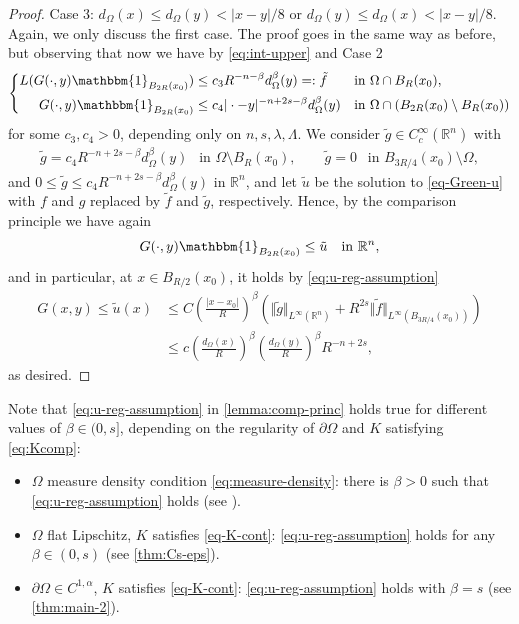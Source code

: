 \documentclass[11pt,reqno]{amsart}
\theoremstyle{plain}
\theoremstyle{definition}
\numberwithin{equation}{section}
\newcommand{\R}{\mathbb{R}}
\newcommand{\1}{\mathbbm{1}}
\begin{document}
\begin{proof}
Case 3: $d_{\Omega}(x) \le d_{\Omega}(y) < |x-y|/8$ or $d_{\Omega}(y) \le d_{\Omega}(x) < |x-y|/8$. Again, we only discuss the first case. The proof goes in the same way as before, but observing that now we have by \eqref{eq:int-upper} and Case 2
\begin{align*}
\left\{
\begin{aligned}
L(G(\cdot,y)\mathbbm{1}_{B_{2R}(x_0)}) &\le c_3 R^{-n-\beta} d_{\Omega}^{\beta}(y) =:\tilde{f} &&\text{in } \Omega \cap B_{R}(x_0), \\
G(\cdot,y)\mathbbm{1}_{B_{2R}(x_0)} &\le c_4 |\cdot-y|^{-n+2s-\beta} d_{\Omega}^{\beta}(y) &&\text{in } \Omega \cap (B_{2R}(x_0) \setminus B_{R}(x_0))
\end{aligned}
\right.
\end{align*}
for some $c_3, c_4 > 0$, depending only on $n,s,\lambda,\Lambda$. We consider $\tilde{g} \in C_c^{\infty}(\R^n)$ with
\begin{align*}
        \tilde{g} = c_4 R^{-n+2s-\beta}d_{\Omega}^{\beta}(y) ~~ \text{ in } \Omega \setminus B_R(x_0), \qquad \tilde{g} = 0~~ \text{ in } B_{3R/4}(x_0) \setminus \Omega,
\end{align*}
and $0 \le \tilde{g} \le c_4 R^{-n+2s-\beta} d_{\Omega}^{\beta}(y)$ in $\R^n$, and let $\tilde{u}$ be the solution to \eqref{eq-Green-u} with $f$ and $g$ replaced by $\tilde{f}$ and $\tilde{g}$, respectively. Hence, by the comparison principle we have again 
\begin{align*}
G(\cdot,y)\mathbbm{1}_{B_{2R}(x_0)} \le \tilde{u} ~~ \text{ in } \R^n,
\end{align*}
and in particular, at $x \in B_{R/2}(x_0)$, it holds by \eqref{eq:u-reg-assumption}
\begin{align*}
G(x,y) \le \tilde{u}(x)
&\le C \left( \frac{|x-x_0|}{R} \right)^{\beta} \left( \Vert \tilde{g} \Vert_{L^{\infty}(\R^n)} + R^{2s} \Vert \tilde{f} \Vert_{L^{\infty}(B_{3R/4}(x_0))} \right) \\
&\le c \left( \frac{d_\Omega(x)}{R} \right)^\beta \left( \frac{d_\Omega(y)}{R} \right)^\beta R^{-n+2s},
\end{align*}
as desired.
\end{proof}


\begin{remark}
\label{remark:Green-function-general-domains}
Note that \eqref{eq:u-reg-assumption} in \autoref{lemma:comp-princ} holds true for different values of $\beta \in (0,s]$, depending on the regularity of $\partial \Omega$ and $K$ satisfying \eqref{eq:Kcomp}:
\begin{itemize}
\item[(i)] $\Omega$ measure density condition \eqref{eq:measure-density}: there is $\beta > 0$ such that \eqref{eq:u-reg-assumption} holds (see \cite{KKP16}).
\item[(ii)] $\Omega$ flat Lipschitz, $K$ satisfies \eqref{eq-K-cont}: \eqref{eq:u-reg-assumption} holds for any $\beta \in (0,s)$ (see \autoref{thm:Cs-eps}).
\item[(iii)] $\partial \Omega \in C^{1,\alpha}$, $K$ satisfies \eqref{eq-K-cont}: \eqref{eq:u-reg-assumption} holds with $\beta = s$ (see \autoref{thm:main-2}).
\end{itemize}
\end{remark}
\end{document}
